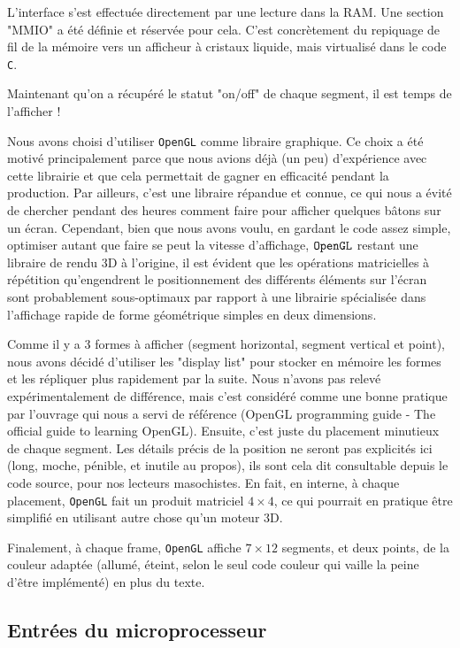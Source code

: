 \documentclass[10pt,a4paper,notitlepage ]{article}
\begin{document}
	L'interface s'est effectuée directement par une lecture dans la RAM. Une section "MMIO" a été définie et réservée pour cela. C'est concrètement du repiquage de fil de la mémoire vers un afficheur à cristaux liquide, mais virtualisé dans le code \texttt{C}.
	
	Maintenant qu'on a récupéré le statut "on/off" de chaque segment, il est temps de l'afficher !
	
	Nous avons choisi d'utiliser \texttt{OpenGL} comme libraire graphique. Ce choix a été motivé principalement parce que nous avions déjà (un peu) d'expérience avec cette librairie et que cela permettait de gagner en efficacité pendant la production. Par ailleurs, c'est une libraire répandue et connue, ce qui nous a évité de chercher pendant des heures comment faire pour afficher quelques bâtons sur un écran. Cependant, bien que nous avons voulu, en gardant le code assez simple, optimiser autant que faire se peut la vitesse d'affichage, $\tt{OpenGL}$ restant une libraire de rendu 3D à l'origine, il est évident que les opérations matricielles à répétition qu'engendrent le positionnement des différents éléments sur l'écran sont probablement sous-optimaux par rapport à une librairie spécialisée dans l'affichage rapide de forme géométrique simples en deux dimensions.
	
	Comme il y a 3 formes à afficher (segment horizontal, segment vertical et point), nous avons décidé d'utiliser les "display list" pour stocker en mémoire les formes et les répliquer plus rapidement par la suite. Nous n'avons pas relevé expérimentalement de différence, mais c'est considéré comme une bonne pratique par l'ouvrage qui nous a servi de référence (OpenGL programming guide - The official guide to learning OpenGL). Ensuite, c'est juste du placement minutieux de chaque segment. Les détails précis de la position ne seront pas explicités ici (long, moche, pénible, et inutile au propos), ils sont cela dit consultable depuis le code source, pour nos lecteurs masochistes. En fait, en interne, à chaque placement, \texttt{OpenGL} fait un produit matriciel $4\times 4$, ce qui pourrait en pratique être simplifié en utilisant autre chose qu'un moteur 3D.
	
	Finalement, à chaque frame, \texttt{OpenGL} affiche $7\times 12$ segments, et deux points, de la couleur adaptée (allumé, éteint, selon le seul code couleur qui vaille la peine d'être implémenté) en plus du texte.
	
	\subsection{Entrées du microprocesseur}
	
\end{document}
